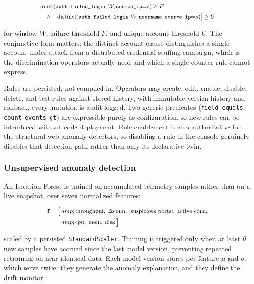 \documentclass[conference]{IEEEtran}
\begin{document}
\begin{equation}
\footnotesize
\begin{aligned}
&\text{count}(\texttt{auth.failed\_login}, W, \texttt{source\_ip}{=}s) \geq F \\
&\quad \land\;\; \bigl|\text{distinct}(\texttt{auth.failed\_login}, W,
  \texttt{username}, \texttt{source\_ip}{=}s)\bigr| \geq U
\end{aligned}
\end{equation}

\noindent for window $W$, failure threshold $F$, and unique-account
threshold $U$. The conjunctive form matters: the distinct-account clause
distinguishes a single account under attack from a distributed
credential-stuffing campaign, which is the discrimination operators
actually need and which a single-counter rule cannot express.

Rules are persisted, not compiled in. Operators may create, edit, enable,
disable, delete, and test rules against stored history, with immutable
version history and rollback; every mutation is audit-logged. Two generic
predicates (\texttt{field\_equals}, \texttt{count\_events\_gt}) are
expressible purely as configuration, so new rules can be introduced without
code deployment. Rule enablement is also authoritative for the structural
web-anomaly detectors, so disabling a rule in the console genuinely disables
that detection path rather than only its declarative twin.

\subsubsection{Unsupervised anomaly detection}

An Isolation Forest \cite{liu2008isolation} is trained on accumulated
telemetry samples rather than on a live snapshot, over seven normalized
features:

\begin{equation}
\footnotesize
\begin{aligned}
\mathbf{f} = \bigl[\,&amp;\text{throughput},\; \Delta\text{conn},\;
|\text{suspicious ports}|,\; \text{active conn},\\
             &amp;\text{cpu},\; \text{mem},\; \text{disk}\,\bigr]
\end{aligned}
\end{equation}

\noindent scaled by a persisted \texttt{StandardScaler}. Training is
triggered only when at least $\theta$ new samples have accrued since the
last model version, preventing repeated retraining on near-identical data.
Each model version stores per-feature $\mu$ and $\sigma$, which serve twice:
they generate the anomaly explanation, and they define the drift monitor
\end{document}
